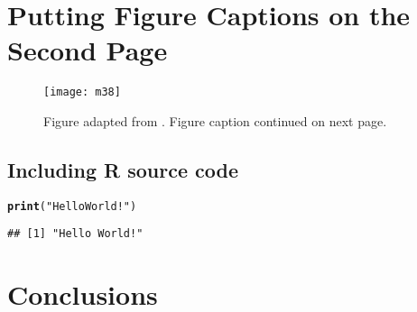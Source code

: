 \documentclass[PhD]{dukethesis}\usepackage[]{graphicx}\usepackage[]{color}
\makeatletter
\newcommand{\hlstr}[1]{\textcolor[rgb]{0.192,0.494,0.8}{#1}}%
\newcommand{\hlstd}[1]{\textcolor[rgb]{0.345,0.345,0.345}{#1}}%
\newcommand{\hlkwd}[1]{\textcolor[rgb]{0.737,0.353,0.396}{\textbf{#1}}}%
\newenvironment{kframe}{%
 \def\at@end@of@kframe{}%
 \ifinner\ifhmode%
  \def\at@end@of@kframe{\end{minipage}}%
  \begin{minipage}{\columnwidth}%
 \fi\fi%
 \def\FrameCommand##1{\hskip\@totalleftmargin \hskip-\fboxsep
 \colorbox{shadecolor}{##1}\hskip-\fboxsep
     \hskip-\linewidth \hskip-\@totalleftmargin \hskip\columnwidth}%
 \MakeFramed {\advance\hsize-\width
   \@totalleftmargin\z@ \linewidth\hsize
   \@setminipage}}%
 {\par\unskip\endMakeFramed%
 \at@end@of@kframe}
\newenvironment{knitrout}{}{} %
\makeatother
\begin{document}

\chapter{Putting Figure Captions on the Second Page}
\label{chap:04}

\begin{figure}[ht] 
	\begin{center}
		\texttt{[image: m38]}
			\caption[This is a figure caption.]{Figure adapted from
			\cite{Courtland2021}. Figure caption continued on next page.}
		\label{fig:m38}
	\end{center}
\end{figure}

\begin{figure}[t]
		\contcaption{\lipsum[3]}
\end{figure}


\section{Including R source code}

\begin{singlespace} %

\begin{knitrout}
\color{fgcolor}\begin{kframe}
\begin{alltt}
\hlkwd{print}\hlstd{(}\hlstr{"Hello World!"}\hlstd{)}
\end{alltt}
\begin{verbatim}
## [1] "Hello World!"
\end{verbatim}
\end{kframe}
\end{knitrout}
\end{singlespace}



\chapter{Conclusions}

\lipsum[1-3]



\startbibliography{}

\begin{singlespace} %


\end{singlespace}



%
%


\end{document}
